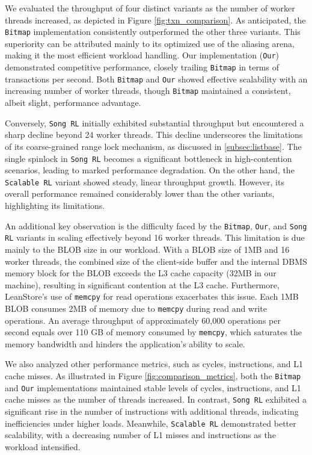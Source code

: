We evaluated the throughput of four distinct variants as the number of worker threads increased, as depicted in Figure \ref{fig:txn_comparison}. As anticipated, the \texttt{Bitmap} implementation consistently outperformed the other three variants. This superiority can be attributed mainly to its optimized use of the aliasing arena, making it the most efficient workload handling. Our implementation (\texttt{Our}) demonstrated competitive performance, closely trailing \texttt{Bitmap} in terms of transactions per second. Both \texttt{Bitmap} and \texttt{Our} showed effective scalability with an increasing number of worker threads, though \texttt{Bitmap} maintained a consistent, albeit slight, performance advantage.

Conversely, \texttt{Song RL} initially exhibited substantial throughput but encountered a sharp decline beyond 24 worker threads. This decline underscores the limitations of its coarse-grained range lock mechanism, as discussed in \ref{subsec:listbase}. The single spinlock in \texttt{Song RL} becomes a significant bottleneck in high-contention scenarios, leading to marked performance degradation. On the other hand, the \texttt{Scalable RL} variant showed steady, linear throughput growth. However, its overall performance remained considerably lower than the other variants, highlighting its limitations.

An additional key observation is the difficulty faced by the \texttt{Bitmap}, \texttt{Our}, and \texttt{Song RL} variants in scaling effectively beyond 16 worker threads. This limitation is due mainly to the BLOB size in our workload. With a BLOB size of 1MB and 16 worker threads, the combined size of the client-side buffer and the internal DBMS memory block for the BLOB exceeds the L3 cache capacity (32MB in our machine), resulting in significant contention at the L3 cache. Furthermore, LeanStore's use of \texttt{memcpy} for read operations exacerbates this issue. Each 1MB BLOB consumes 2MB of memory due to \texttt{memcpy} during read and write operations. An average throughput of approximately 60,000 operations per second equals over 110 GB of memory consumed by \texttt{memcpy}, which saturates the memory bandwidth and hinders the application's ability to scale.

We also analyzed other performance metrics, such as cycles, instructions, and L1 cache misses. As illustrated in Figure \ref{fig:comparison_metrics}, both the \texttt{Bitmap} and \texttt{Our} implementations maintained stable levels of cycles, instructions, and L1 cache misses as the number of threads increased. In contrast, \texttt{Song RL} exhibited a significant rise in the number of instructions with additional threads, indicating inefficiencies under higher loads. Meanwhile, \texttt{Scalable RL} demonstrated better scalability, with a decreasing number of L1 misses and instructions as the workload intensified.


